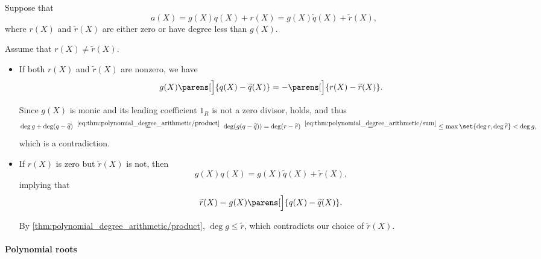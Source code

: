 \begin{defproof}
  \UniquenessSubProof Suppose that
  \begin{equation*}
    a(X) = g(X)q(X) + r(X) = g(X) \widetilde{q}(X) + \widetilde{r}(X),
  \end{equation*}
  where \( r(X) \) and \( \widetilde{r}(X) \) are either zero or have degree less than \( g(X) \).

  Assume that \( r(X) \neq \widetilde{r}(X) \).

  \begin{itemize}
    \item If both \( r(X) \) and \( \widetilde{r}(X) \) are nonzero, we have
    \begin{equation*}
      g(X) \parens[\Big]{ q(X) - \widetilde{q}(X) } = -\parens[\Big]{ r(X) - \widetilde{r}(X) }.
    \end{equation*}

    Since \( g(X) \) is monic and its leading coefficient \( 1_R \) is not a zero divisor,  holds, and thus
    \begin{equation*}
      \deg g + \deg(q - \widetilde{q})
      \reloset {\eqref{eq:thm:polynomial_degree_arithmetic/product}} =
      \deg(g (q - \widetilde{q}))
      =
      \deg(r - \widetilde{r})
      \reloset {\eqref{eq:thm:polynomial_degree_arithmetic/sum}} =
      \leq \max\set{ \deg r, \deg \widetilde{r} }
      <
      \deg g,
    \end{equation*}
    which is a contradiction.

    \item If \( r(X) \) is zero but \( \widetilde{r}(X) \) is not, then
    \begin{equation*}
      g(X) q(X) = g(X) \widetilde{q}(X) + \widetilde{r}(X),
    \end{equation*}
    implying that
    \begin{equation*}
      \widetilde{r}(X) = g(X) \parens[\Big]{ q(X) - \widetilde{q}(X) }.
    \end{equation*}

    By \eqref{thm:polynomial_degree_arithmetic/product}, \( \deg g \leq \widetilde{r} \), which contradicts our choice of \( \widetilde{r}(X) \).
  \end{itemize}
\end{defproof}

\paragraph{Polynomial roots}

